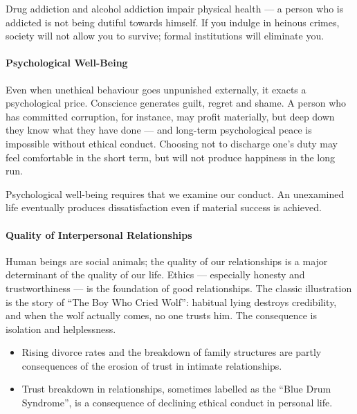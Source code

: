 \begin{ExampleBox}
Drug addiction and alcohol addiction impair physical health --- a person who is addicted is not being dutiful towards himself. If you indulge in heinous crimes, society will not allow you to survive; formal institutions will eliminate you.
\end{ExampleBox}

\paragraph{Psychological Well-Being} Even when unethical behaviour goes unpunished externally, it exacts a psychological price. Conscience generates guilt, regret and shame. A person who has committed corruption, for instance, may profit materially, but deep down they know what they have done --- and long-term psychological peace is impossible without ethical conduct. Choosing not to discharge one's duty may feel comfortable in the short term, but will not produce happiness in the long run.

\begin{KeyConcept}
Psychological well-being requires that we examine our conduct. An unexamined life eventually produces dissatisfaction even if material success is achieved.
\end{KeyConcept}

\paragraph{Quality of Interpersonal Relationships} Human beings are social animals; the quality of our relationships is a major determinant of the quality of our life. Ethics --- especially honesty and trustworthiness --- is the foundation of good relationships. The classic illustration is the story of ``The Boy Who Cried Wolf'': habitual lying destroys credibility, and when the wolf actually comes, no one trusts him. The consequence is isolation and helplessness.

\begin{DataFact}
\begin{itemize}
\item Rising divorce rates and the breakdown of family structures are partly consequences of the erosion of trust in intimate relationships.
\item Trust breakdown in relationships, sometimes labelled as the ``Blue Drum Syndrome'', is a consequence of declining ethical conduct in personal life.
\end{itemize}
\end{DataFact}

